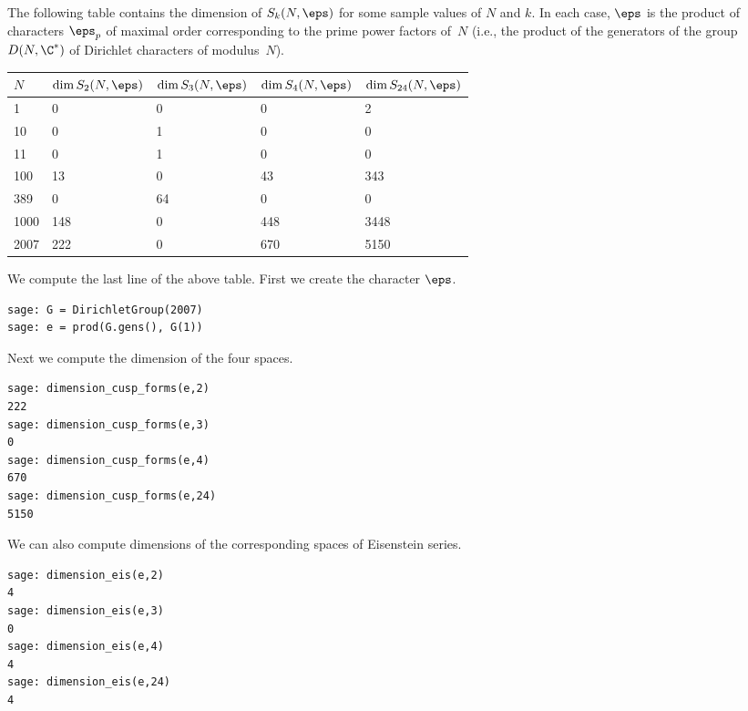 The following table contains the dimension of $S_k(N,\eps)$
for some sample values of $N$ and $k$.  In each case, $\eps$
is the product of characters $\eps_p$ of maximal order
corresponding to the prime power factors of~$N$ (i.e.,
the product of the generators of the group
$D(N,\C^*)$ of Dirichlet characters of modulus~$N$).
\begin{center}
\begin{tabular}{|l|llll|}\hline
$N$ & $\dim S_2(N,\eps)$ & $\dim S_3(N,\eps)$ & 
      $\dim S_4(N,\eps)$ & $\dim S_{24}(N,\eps)$\\\hline
1 & 0 & 0 & 0 & 2\\
10 & 0 & 1 & 0 & 0\\
11 & 0 & 1 & 0 & 0\\
100 & 13 & 0 & 43 & 343\\
389 & 0 & 64 & 0 & 0\\
1000 & 148 & 0 & 448 & 3448\\
2007 & 222 & 0 & 670 & 5150\\\hline
\end{tabular}
\end{center}

\begin{example}
We compute the last line of the above table.  First 
we create the character $\eps$.
\begin{verbatim}
sage: G = DirichletGroup(2007)
sage: e = prod(G.gens(), G(1))
\end{verbatim}%

Next we compute the dimension of the four spaces.
\begin{verbatim}
sage: dimension_cusp_forms(e,2)
222
sage: dimension_cusp_forms(e,3)
0
sage: dimension_cusp_forms(e,4)
670
sage: dimension_cusp_forms(e,24)
5150
\end{verbatim}%

We can also compute dimensions of the corresponding
spaces of Eisenstein series. 
\begin{verbatim}
sage: dimension_eis(e,2)
4
sage: dimension_eis(e,3)
0
sage: dimension_eis(e,4)
4
sage: dimension_eis(e,24)
4
\end{verbatim}
\end{example}



